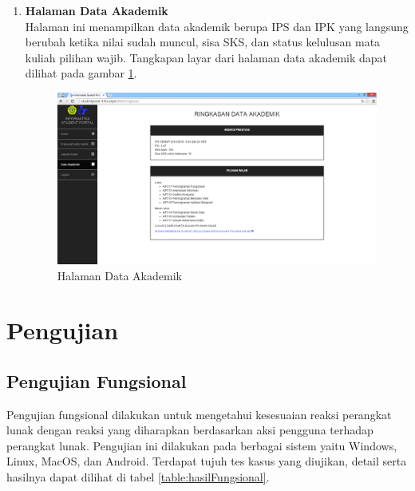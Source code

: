 \begin{enumerate}
				\item\textbf{Halaman Data Akademik}\\
				Halaman ini menampilkan data akademik berupa IPS dan IPK yang langsung berubah ketika nilai sudah muncul, sisa SKS, dan status kelulusan mata kuliah pilihan wajib. Tangkapan layar dari halaman data akademik dapat dilihat pada gambar \ref{fig:5_hasil_ringkasan}.
				\begin{figure}[H]
						\centering
						\includegraphics[scale=0.34]{Gambar/hasil_ringkasan}
						\caption{Halaman Data Akademik} 
						\label{fig:5_hasil_ringkasan}
					\end{figure}
			\end{enumerate}
				
\section{Pengujian}
			\subsection{Pengujian Fungsional} 
			Pengujian fungsional dilakukan untuk mengetahui kesesuaian reaksi perangkat lunak dengan reaksi yang diharapkan berdasarkan aksi pengguna terhadap perangkat lunak. Pengujian ini dilakukan pada berbagai sistem yaitu Windows, Linux, MacOS, dan Android. Terdapat tujuh tes kasus yang diujikan, detail serta hasilnya dapat dilihat di tabel \ref{table:hasilFungsional}.
			
